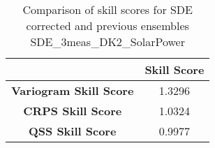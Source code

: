 
        \begin{table}[h!]
            \centering
            \begin{tabular}{|c|c|}
                \hline
                & \textbf{Skill Score}  \\
                \hline
                \textbf{Variogram Skill Score} & 1.3296  \\
                \hline
                \textbf{CRPS Skill Score} & 1.0324  \\
                \hline
                \textbf{QSS Skill Score} & 0.9977 \\
                \hline
            \end{tabular}
            \caption{Comparison of skill scores for SDE corrected and previous ensembles SDE_3meas_DK2_SolarPower}
            \label{table:skill_scores_comparison}
        \end{table}
        